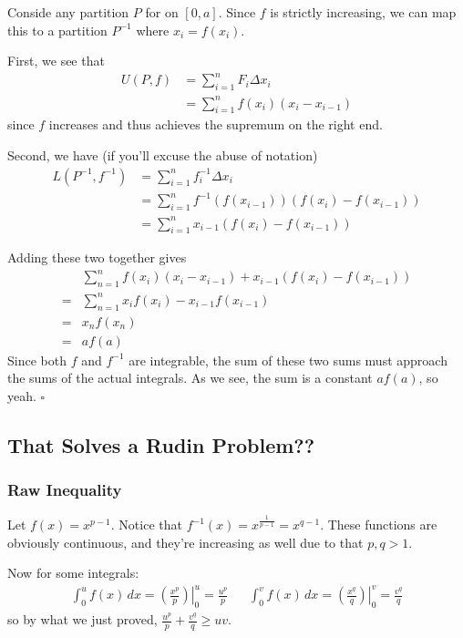 \documentclass[12pt]{article}
\begin{document}
Conside any partition $P$ for on $[0, a]$.
Since $f$ is strictly increasing, we can map this to a partition $P^{-1}$ where $x_i=f(x_i)$.

First, we see that
\begin{align*}
  U(P, f)
   & =\sum_{i=1}^{n} F_i \Delta x_i         \\
   & = \sum_{i=1}^{n} f(x_i)(x_i - x_{i-1})
\end{align*}
since $f$ increases and thus achieves the supremum on the right end.

Second, we have (if you'll excuse the abuse of notation)
\begin{align*}
  L\left(P^{-1}, f^{-1}\right)
   & = \sum_{i=1}^{n} f^{-1}_i \Delta x_i                   \\
   & = \sum_{i=1}^{n} f^{-1}(f(x_{i-1}))(f(x_i)-f(x_{i-1})) \\
   & = \sum_{i=1}^{n} x_{i-1}(f(x_i)-f(x_{i-1}))
\end{align*}

Adding these two together gives
\begin{align*}
      & \sum_{n=1}^{n} f(x_i)(x_i-x_{i-1})+x_{i-1}(f(x_i)-f(x_{i-1})) \\
  ={} & \sum_{n=1}^{n} x_i f(x_i) - x_{i-1} f(x_{i-1})                \\
  ={} & x_n f(x_n)                                                    \\
  ={} & a f(a)
\end{align*}
Since both $f$ and $f^{-1}$ are integrable, the sum of these
two sums must approach the sums of the actual integrals.
As we see, the sum is a constant $a f(a)$, so yeah. $\square$

\pagebreak

\subsection{That Solves a Rudin Problem??}

\subsubsection{Raw Inequality}

Let $f(x)=x^{p-1}$.
Notice that $f^{-1}(x)=x^{\frac{1}{p-1}}=x^{q-1}$.
These functions are obviously continuous, and they're increasing as well due to that $p, q > 1$.

Now for some integrals:
\begin{align*}
  \int_{0}^{u} f(x)\,dx = \left.\left(\frac{x^p}{p}\right)\right|^u_0=\frac{u^p}{p} &  &
  \int_{0}^{v} f(x)\,dx = \left.\left(\frac{x^q}{q}\right)\right|^v_0=\frac{v^q}{q}
\end{align*}
so by what we just proved, $\frac{u^p}{p}+\frac{v^q}{q} \ge uv$.
\end{document}
